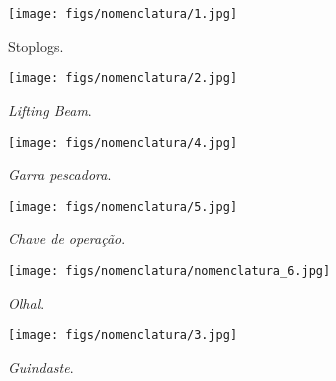 \begin{figure}[H]
    \centering
    \texttt{[image: figs/nomenclatura/1.jpg]}
    \caption{Stoplogs.}
    \label{nomenclatura_1}
\end{figure}

\begin{figure}[H]
    \centering
    \texttt{[image: figs/nomenclatura/2.jpg]}
    \caption{\emph{Lifting Beam}.}
    \label{nomenclatura_2}
\end{figure}


\begin{figure}[H]
    \centering
    \texttt{[image: figs/nomenclatura/4.jpg]}
    \caption{\emph{Garra pescadora}.}
    \label{nomenclatura_4}
\end{figure}

\begin{figure}[H]
    \centering
    \texttt{[image: figs/nomenclatura/5.jpg]}
    \caption{\emph{Chave de operação}.}
    \label{nomenclatura_5}
\end{figure}

\begin{figure}[H]
    \centering
    \texttt{[image: figs/nomenclatura/nomenclatura\_6.jpg]}
    \caption{\emph{Olhal}.}
    \label{nomenclatura_6}
\end{figure}

\begin{figure}[H]
    \centering
    \texttt{[image: figs/nomenclatura/3.jpg]}
    \caption{\emph{Guindaste}.}
    \label{nomenclatura_3}
\end{figure}
